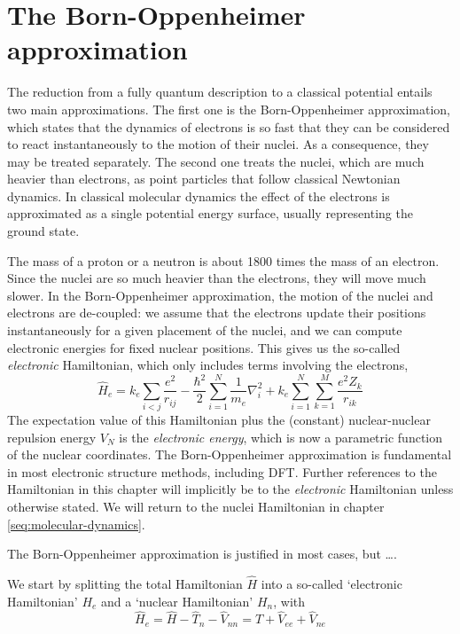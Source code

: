 \documentclass[11pt,bibliography=totoc,index=totoc]{scrbook}   %
\begin{document}
\section{The Born-Oppenheimer approximation}\label{seq:born-oppenheimer}

The reduction from a fully quantum description to a classical potential entails two main approximations. The first one is the Born-Oppenheimer approximation, which states that the dynamics of electrons is so fast that they can be considered to react instantaneously to the motion of their nuclei. As a consequence, they may be treated separately. The second one treats the nuclei, which are much heavier than electrons, as point particles that follow classical Newtonian dynamics. In classical molecular dynamics the effect of the electrons is approximated as a single potential energy surface, usually representing the ground state.

The mass of a proton or a neutron is about 1800 times the mass of an electron.
Since the nuclei are so much heavier than the electrons, they will move much
slower. In the Born-Oppenheimer approximation, the motion of the 
nuclei and
electrons are de-coupled: we assume that the electrons update their positions
instantaneously for a given placement of the nuclei, and we can compute
electronic energies for fixed nuclear positions. This gives us the so-called
\emph{electronic} Hamiltonian, which only includes terms involving the
electrons,
\begin{equation}
  \hat{H}_e = 
	k_e  \sum_{i<j}\frac{e^2}{r_{ij}}
	-\frac{\hbar^2}{2}\sum_{i=1}^N\frac{1}{m_e}\nabla_i^2
		+ k_e \sum_{i=1}^N\sum_{k=1}^M \frac{e^2Z_k}{r_{ik}}
  \label{eq:el-hamiltonian}
\end{equation}
The expectation value of this Hamiltonian plus the (constant) nuclear-nuclear 
repulsion energy $V_N$ is the \emph{electronic energy}, which
is now a parametric function of the nuclear coordinates. The Born-Oppenheimer
approximation is fundamental in most electronic structure methods, including
DFT. Further references to the Hamiltonian in this chapter will implicitly 
be to the \emph{electronic} Hamiltonian unless otherwise stated. 
We will return to the nuclei Hamiltonian in chapter \ref{seq:molecular-dynamics}.



The Born-Oppenheimer approximation is justified in most 
cases\cite[p. 111]{Cramer:2004}, but \dots.

We start by splitting the total Hamiltonian $\hat{H}$ into a so-called `electronic Hamiltonian' $H_e$ and a `nuclear Hamiltonian' $H_n$, with
\begin{equation}
  \hat{H}_e = \hat{H} - \hat{T}_n - \hat{V}_{nn} = \hat{T} + \hat{V}_{ee} + \hat{V}_{ne}
\end{equation}
\end{document}

